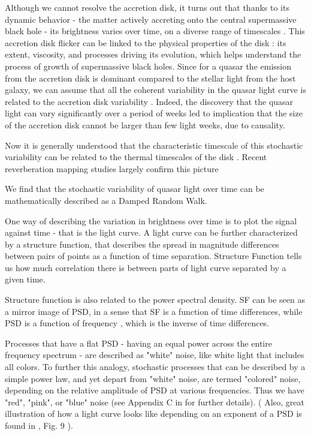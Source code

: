 \documentclass[modern]{aastex62}
\begin{document}
Although we cannot resolve the accretion disk, it turns out that thanks to its dynamic behavior  - the matter actively accreting onto the central supermassive black hole - its brightness varies over time, on a diverse range of timescales \citep{schawinski2015}. This accretion disk flicker can be linked to the physical properties of the disk : its extent, viscosity, and processes driving its evolution, which helps understand the process of growth of supermassive black holes.  Since for a quasar the emission from the accretion disk is dominant compared to the stellar light from the host galaxy, we can assume that all the coherent variability  in the quasar light curve is related to the accretion disk variability . Indeed, the discovery that the quasar light can vary significantly over a period of weeks led to implication that the size of the accretion disk cannot be larger than few light weeks, due to causality. 

Now it is generally understood that the characteristic timescale of this stochastic  variability can be related to the thermal timescales of the disk \citep{kelly2007, zu2013, kozlowski2016a}. Recent reverberation mapping studies largely confirm this picture \citep{sun2015}




We find that the stochastic variability of quasar light over time can be mathematically described as a Damped Random Walk. 



One way of describing the variation in brightness over time is to plot the signal against time - that is the light curve.  A light curve can be further characterized by a structure function, that describes the spread in magnitude differences between pairs of points as a function of time separation. Structure Function tells us how much correlation there is between parts of light curve separated by a given time.  

Structure function is also related to the power spectral density. SF can be seen as a mirror image of PSD, in a sense that SF is a function of time differences, while PSD is a function of frequency , which is the inverse of  time differences. 

Processes that have a flat PSD - having an equal power across the entire frequency spectrum -  are described as "white" noise, like white light that includes all colors. To further this analogy, stochastic processes that can be described by a simple power law, and yet depart from "white" noise, are termed  "colored" noise, depending on the relative amplitude of PSD at various frequencies. Thus we have "red", "pink", or "blue" noise   (see Appendix  C in \cite{kasliwal2017} for further details). ( Also, great illustration of how a light curve looks like depending on an exponent of a PSD is found in \cite{macleod2010}, Fig. 9 ). 
\end{document}
